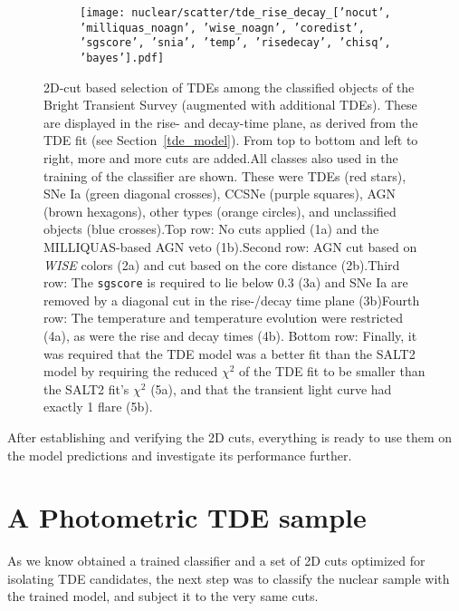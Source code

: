 \begin{figure}[htbp]
\begin{subfigure}[b]{0.49\textwidth}
  \end{subfigure}
  \begin{subfigure}[b]{0.49\textwidth}
    \centering
    \texttt{[image: nuclear/scatter/tde\_rise\_decay\_['nocut', 'milliquas\_noagn', 'wise\_noagn', 'coredist', 'sgscore', 'snia', 'temp', 'risedecay', 'chisq', 'bayes'].pdf]}
  \end{subfigure}
  \caption[BTS selection]{2D-cut based selection of TDEs among the classified objects of the Bright Transient Survey (augmented with additional TDEs). These are displayed in the rise- and decay-time plane, as derived from the TDE fit (see Section~\ref{tde_model}). From top to bottom and left to right, more and more cuts are added.\newline \newline All classes also used in the training of the classifier are shown. These were TDEs (red stars), SNe Ia (green diagonal crosses), CCSNe (purple squares), AGN (brown hexagons), other types (orange circles), and unclassified objects (blue crosses).\newline \newline Top row: No cuts applied (1a) and the MILLIQUAS-based AGN veto (1b).\newline \newline Second row: AGN cut based on \textit{WISE} colors (2a) and cut based on the core distance (2b).\newline \newline Third row: The \texttt{sgscore} is required to lie below 0.3 (3a) and SNe Ia are removed by a diagonal cut in the rise-/decay time plane (3b)\newline \newline Fourth row: The temperature and temperature evolution were restricted (4a), as were the rise and decay times (4b). \newline \newline Bottom row: Finally, it was required that the TDE model was a better fit than the SALT2 model by requiring the reduced $\chi^2$ of the TDE fit to be smaller than the SALT2 fit's $\chi^2$ (5a), and that the transient light curve had exactly 1 flare (5b).}
\end{figure}

After establishing and verifying the 2D cuts, everything is ready to use them on the model predictions and investigate its performance further.

\section{A Photometric TDE sample}
As we know obtained a trained classifier and a set of 2D cuts optimized for isolating TDE candidates, the next step was to classify the nuclear sample with the trained model, and subject it to the very same cuts.

